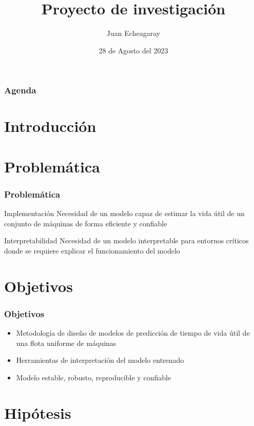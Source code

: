 \documentclass{beamer}
\title{Proyecto de investigación}
\author{Juan Echeagaray}
\institute{Tec de Monterrey}
\date{28 de Agosto del 2023}
\begin{document}
    \frame{\titlepage}

    \begin{frame}
        \frametitle{Agenda}
        \tableofcontents
    \end{frame}

    \section{Introducción}

    \section{Problemática}

        \begin{frame}
            \frametitle{Problemática}
            \begin{block}{Implementación}
                Necesidad de un modelo capaz de estimar la vida útil de un conjunto de máquinas de forma eficiente y confiable
            \end{block}

            \begin{alertblock}{Interpretabilidad}
                Necesidad de un modelo interpretable para entornos críticos donde se requiere explicar el funcionamiento del modelo
            \end{alertblock}

        \end{frame}

    \section{Objetivos}

        \begin{frame}
            \frametitle{Objetivos}
            \begin{itemize}
                \item Metodología de diseño de modelos de predicción de tiempo de vida útil de una flota uniforme de máquinas
                \item Herramientas de interpretación del modelo entrenado
                \item Modelo estable, robusto, reproducible y confiable
            \end{itemize}
        \end{frame}

    \section{Hipótesis}
\end{document}
